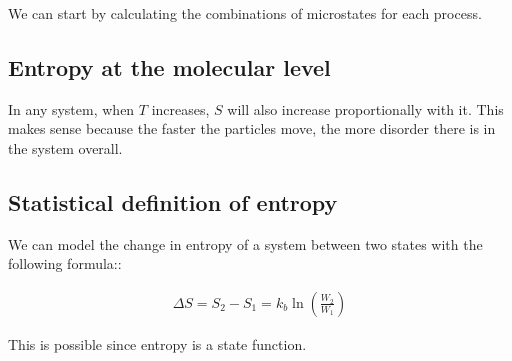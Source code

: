 \documentclass[12pt]{book}
\begin{document}
We can start by calculating the combinations of microstates for each process. %

\subsection*{Entropy at the molecular level}

In any system, when $T$ increases, $S$ will also increase proportionally with it. This makes sense because the faster the particles move, the more disorder there is in the system overall.

\subsection*{Statistical definition of entropy}

We can model the change in entropy of a system between two states with the following formula::

\begin{align*}
    \Delta S=S_2-S_1=k_b\ln(\frac{W_2}{W_1})
\end{align*}

This is possible since entropy is a state function.
\end{document}
